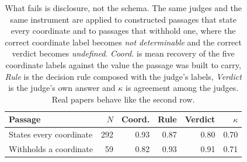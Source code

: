 \begin{table}[t]
\centering\scriptsize
\setlength{\tabcolsep}{3pt}
\begin{tabular}{@{}lrrrrr@{}}
\toprule
Passage & $N$ & Coord. & Rule & Verdict & $\kappa$ \\
\midrule
States every coordinate & 292 & 0.93 & 0.87 & 0.80 & 0.70 \\
Withholds a coordinate & 59 & 0.82 & 0.93 & 0.91 & 0.71 \\
\bottomrule
\end{tabular}
\caption{What fails is disclosure, not the schema. The same judges and the same instrument are applied to constructed passages that state every coordinate and to passages that withhold one, where the correct coordinate label becomes \emph{not determinable} and the correct verdict becomes \emph{undefined}. \emph{Coord.} is mean recovery of the five coordinate labels against the value the passage was built to carry, \emph{Rule} is the decision rule composed with the judge's labels, \emph{Verdict} is the judge's own answer and $\kappa$ is agreement among the judges. Real papers behave like the second row.}
\label{tab:instrument-disclosure}
\end{table}
